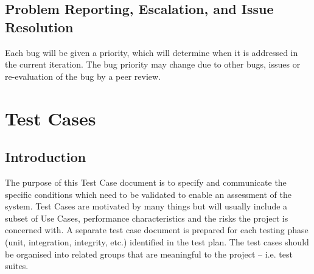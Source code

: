 \subsection{Problem Reporting, Escalation, and Issue Resolution}
Each bug will be given a priority, which will determine when it is addressed in the current iteration. The bug priority may change due to other bugs, issues or re-evaluation of the bug by a peer review.

\section{Test Cases}
\subsection{Introduction}
The purpose of this Test Case document is to specify and communicate the specific
conditions which need to be validated to enable an assessment of the system. Test
Cases are motivated by many things but will usually include a subset of Use Cases,
performance characteristics and the risks the project is concerned with.
A separate test case document is prepared for each testing phase (unit,
integration, integrity, etc.) identified in the test plan. The test cases should be
organised into related groups that are meaningful to the project – i.e. test suites.

